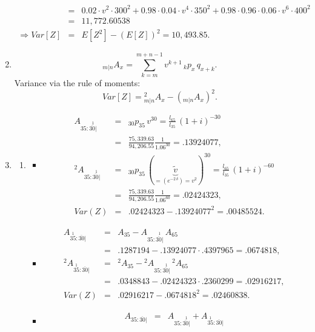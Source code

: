 \documentclass[11pt,fleqn,oneside]{book}
\begin{document}
\begin{enumerate}
\begin{eqnarray*}
 &=& 0.02 \cdot v^2 \cdot 300^2 + 0.98\cdot 0.04 \cdot v^4 \cdot 350^2 + 0.98\cdot 0.96 \cdot 0.06 \cdot v^6 \cdot 400^2\\
 &=& 11,772.60538\\
 \Rightarrow Var[Z] &=& E[Z^2] - \left(E[Z]\right)^2 = 10,493.85.
 \end{eqnarray*}
 \item
 $$%
 {_{m|n}A_x} = \sum_{k=m}^{m+n-1} v^{k+1}\,{_kp_x}\,{q_{x+k}}.
 $$%
Variance via the rule of moments:
$$
Var[Z] = {^2_{m|n}A_x} - \left({_{m|n}A_x}\right)^2.
$$
\item
\begin{enumerate}
\item 
\begin{itemize}
 \item
 \begin{eqnarray*}
 {A_{35:\stackrel{1}{\overline{30}|}}} &=& {_{30}p_{35}}\,v^{30} = \frac{l_{65}}{l_{35}}\,(1+i)^{-30}\\
 &=& \frac{75,339.63}{94,206.55}\frac{1}{1.06^{30}} = .13924077,\\
 {^2A_{35:\stackrel{1}{\overline{30}|}}} &=& {_{30}p_{35}}\,(\underbrace{\tilde{v}}_{=(e^{-2\,\delta})=v^2})^{30} = \frac{l_{65}}{l_{35}}\,(1+i)^{-60}\\
 &=& \frac{75,339.63}{94,206.55}\frac{1}{1.06^{60}} = .02424323,\\
 Var(Z) &=& .02424323 - .13924077^2 = .00485524.
 \end{eqnarray*}
 \item
 \begin{eqnarray*}
 {A_{\stackrel{1}{35}:\overline{30}|}} &=& {A_{35}} -  {A_{35:\stackrel{1}{\overline{30}|}}} \,{A_{65}}\\
 &=& .1287194 - .13924077\cdot .4397965 = .0674818,\\
 {^2A_{\stackrel{1}{35}:\overline{30}|}} &=& {^2A_{35}} -  {^2A_{35:\stackrel{1}{\overline{30}|}}} \,{^2A_{65}}\\
 &=& .0348843 - .02424323\cdot .2360299 = .02916217,\\
 Var(Z) &=& .02916217 - .0674818^2 = .02460838.
 \end{eqnarray*}
 \item
 \begin{eqnarray*}
 {A_{35:\overline{30}|}} &=&  {A_{35:\stackrel{1}{\overline{30}|}}}  +  {A_{\stackrel{1}{35}:\overline{30}|}}\\

\end{eqnarray*}
\end{itemize}
\end{enumerate}
\end{enumerate}
\end{document}
